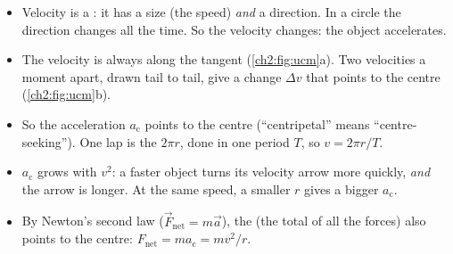 \begin{itemize}
  \item Velocity is a : it has a size (the speed) \emph{and} a direction. In a
        circle the direction changes all the time. So the velocity changes: the object
        accelerates.
  \item The velocity is always along the tangent (\cref{ch2:fig:ucm}a). Two velocities a
        moment apart, drawn tail to tail, give a change $\Delta v$ that points to the centre
        (\cref{ch2:fig:ucm}b).
  \item So the acceleration $a_\mathrm{c}$ points to the centre (``centripetal'' means
        ``centre-seeking''). One lap is the  $2\pi r$, done in one
        period $T$, so $v = 2\pi r/T$.
  \item $a_\mathrm{c}$ grows with $v^2$: a faster object turns its velocity arrow more
        quickly, \emph{and} the arrow is longer. At the same speed, a smaller $r$ gives a bigger
        $a_\mathrm{c}$.
  \item By Newton's second law ($\vec{F}_\mathrm{net} = m\vec{a}$), the  (the
        total of all the forces) also points to the centre: $F_\mathrm{net} = ma_\mathrm{c} = mv^2/r$.
\end{itemize}

